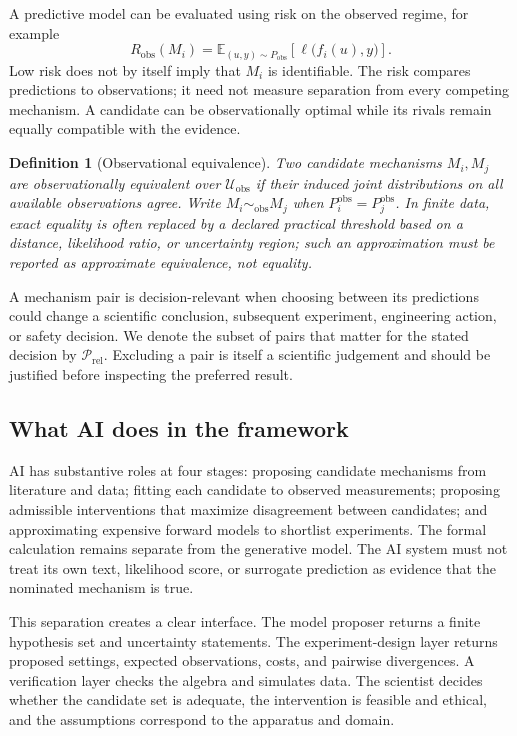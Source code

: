 \documentclass[11pt]{article}
\newtheorem{definition}{Definition}[section]
\newcommand{\Ucal}{\mathcal{U}}
\begin{document}
A predictive model can be evaluated using risk on the observed regime, for example
\begin{equation}
R_{\mathrm{obs}}(M_i)=\mathbb{E}_{(u,y)\sim P_{\mathrm{obs}}}\!\left[\ell\big(f_i(u),y\big)\right].
\end{equation}
Low risk does not by itself imply that $M_i$ is identifiable. The risk compares predictions to observations; it need not measure separation from every competing mechanism. A candidate can be observationally optimal while its rivals remain equally compatible with the evidence.

\begin{definition}[Observational equivalence]
Two candidate mechanisms $M_i,M_j$ are observationally equivalent over $\Ucal_{\mathrm{obs}}$ if their induced joint distributions on all available observations agree. Write $M_i\sim_{\mathrm{obs}}M_j$ when $P_i^{\mathrm{obs}}=P_j^{\mathrm{obs}}$. In finite data, exact equality is often replaced by a declared practical threshold based on a distance, likelihood ratio, or uncertainty region; such an approximation must be reported as approximate equivalence, not equality.
\end{definition}

A mechanism pair is decision-relevant when choosing between its predictions could change a scientific conclusion, subsequent experiment, engineering action, or safety decision. We denote the subset of pairs that matter for the stated decision by $\mathcal{P}_{\mathrm{rel}}$. Excluding a pair is itself a scientific judgement and should be justified before inspecting the preferred result.

\subsection{What AI does in the framework}
AI has substantive roles at four stages: proposing candidate mechanisms from literature and data; fitting each candidate to observed measurements; proposing admissible interventions that maximize disagreement between candidates; and approximating expensive forward models to shortlist experiments. The formal calculation remains separate from the generative model. The AI system must not treat its own text, likelihood score, or surrogate prediction as evidence that the nominated mechanism is true.

This separation creates a clear interface. The model proposer returns a finite hypothesis set and uncertainty statements. The experiment-design layer returns proposed settings, expected observations, costs, and pairwise divergences. A verification layer checks the algebra and simulates data. The scientist decides whether the candidate set is adequate, the intervention is feasible and ethical, and the assumptions correspond to the apparatus and domain.
\end{document}
